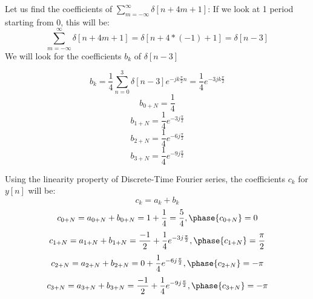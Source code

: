 \documentclass[10pt,a4paper, margin=1in]{article}
\begin{document}
\begin{enumerate}
\begin{enumerate}
    Let us find the coefficients of $\sum_{m = -\infty}^{\infty} \delta[n+4m+1]$:
    If we look at 1 period starting from 0, this will be:
    \begin{equation*}
        \sum_{m = -\infty}^{\infty} \delta[n+4m+1] = \delta[n+4*(-1)+1]  =\delta[n-3]
    \end{equation*}
    We will look for the coefficients $b_k$ of $\delta[n-3]$

    \begin{equation*}
        b_k = \frac{1}{4} \sum_{n = 0}^{3} \delta[n-3] e^{-jk\frac{\pi}{2}n} =\frac{1}{4} e^{-3jk\frac{\pi}{2}}
    \end{equation*}
    \begin{equation}
        b_{0 + N} = \frac{1}{4}
    \end{equation}
    \begin{equation}
        b_{1 + N} = \frac{1}{4} e^{-3j\frac{\pi}{2}}
    \end{equation}
    \begin{equation}
        b_{2 + N} = \frac{1}{4} e^{-6j\frac{\pi}{2}}
    \end{equation}
    \begin{equation}
        b_{3 + N} = \frac{1}{4} e^{-9j\frac{\pi}{2}}
    \end{equation}

    Using the linearity property of Discrete-Time Fourier series, the coefficients $c_k$ for $y[n]$ will be:
    \begin{equation}
        c_k = a_k + b_k
    \end{equation}
    \begin{equation}
        c_{0 + N} = a_{0 + N} + b_{0 + N} = 1 + \frac{1}{4} = \frac{5}{4} , \phase{c_{0 + N}} = 0
    \end{equation}
    \begin{equation}
        c_{1 + N} = a_{1 + N} + b_{1 + N} = \frac{-1}{2} + \frac{1}{4} e^{-3j\frac{\pi}{2}} , \phase{c_{1 + N}} = \frac{\pi}{2}
    \end{equation}
    \begin{equation}
        c_{2 + N} = a_{2 + N} + b_{2 + N} = 0 + \frac{1}{4} e^{-6j\frac{\pi}{2}} ,\phase{c_{2 + N}} =  -\pi
    \end{equation}
    \begin{equation}
        c_{3 + N} = a_{3 + N} + b_{3 + N} = \frac{-1}{2} + \frac{1}{4} e^{-9j\frac{\pi}{2}},\phase{c_{3 + N}} =  -\pi
    \end{equation}


\end{enumerate}
\end{enumerate}
\end{document}

